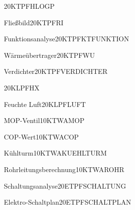 \documentclass[bsz-mkk-exam,ka]{teacher}
\begin{document}

\begin{examaufgabe}{\hlogpdia}{20}{KT}{PF}{HLOGP}

\end{examaufgabe}

\begin{examaufgabe}{Fließbild}{20}{KT}{PF}{RI}
\end{examaufgabe}

\begin{examaufgabe}{Funktionsanalyse}{20}{KT}{PF}{KTFUNKTION}
\end{examaufgabe}

\begin{examaufgabe}{Wärmeübertrager}{20}{KT}{PF}{WU}
\end{examaufgabe}

\begin{examaufgabe}{Verdichter}{20}{KT}{PF}{VERDICHTER}
\end{examaufgabe}

\begin{examaufgabe}{\hxdia}{20}{KL}{PF}{HX}
\end{examaufgabe}

\begin{examaufgabe}{Feuchte Luft}{20}{KL}{PF}{LUFT}
\end{examaufgabe}

\begin{examaufgabe}{MOP-Ventil}{10}{KT}{WA}{MOP}
\end{examaufgabe}

\begin{examaufgabe}{COP-Wert}{10}{KT}{WA}{COP}
\end{examaufgabe}

\begin{examaufgabe}{Kühlturm}{10}{KT}{WA}{KUEHLTURM}
\end{examaufgabe}

\begin{examaufgabe}{Rohrleitungsberechnung}{10}{KT}{WA}{ROHR}
\end{examaufgabe}

\begin{examaufgabe}{Schaltungsanalyse}{20}{ET}{PF}{SCHALTUNG}
\end{examaufgabe}

\begin{examaufgabe}{Elektro-Schaltplan}{20}{ET}{PF}{SCHALTPLAN}
\end{examaufgabe}
\end{document}
